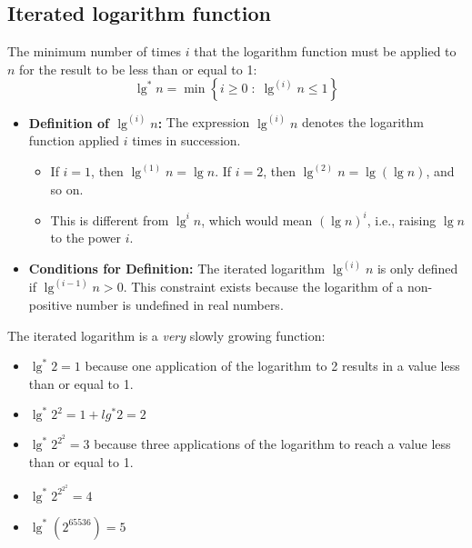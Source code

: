     \subsection{Iterated logarithm function}
        \begin{definition}
            The minimum number of times \( i \) that the logarithm function must be applied to \( n \) for the result to be less than or equal to 1:
            \begin{equation}
                \lg^{*} n = \min \left\{ i \geq 0 \; : \; \lg^{(i)} n \leq 1 \right\}
            \end{equation}
        \end{definition}
        \begin{intuition}
            \begin{itemize}
                \item \textbf{Definition of \( \lg^{(i)} n \):} The expression \( \lg^{(i)} n \) denotes the logarithm function applied \( i \) times in succession. 
                \begin{itemize}
                    \item If \( i = 1 \), then \( \lg^{(1)} n = \lg n \). If \( i = 2 \), then \( \lg^{(2)} n = \lg(\lg n) \), and so on. 
                    \item This is different from \( \lg^i n \), which would mean \( (\lg n)^i \), i.e., raising \( \lg n \) to the power \( i \). 
                \end{itemize}

                \item \textbf{Conditions for Definition:} The iterated logarithm \( \lg^{(i)} n \) is only defined if \( \lg^{(i-1)} n > 0 \). This constraint exists because the logarithm of a non-positive number is undefined in real numbers. 
             \end{itemize}
        \end{intuition}
        \begin{example}
            The iterated logarithm is a \emph{very} slowly growing function:

            \begin{itemize}
                \item \(\lg^{*} 2 = 1\) because one application of the logarithm to 2 results in a value less than or equal to 1.
                \item \(\lg^{*} 2^2 = 1 + lg^{*} 2 = 2\)
                \item \(\lg^{*} 2^{2^2} = 3\) because three applications of the logarithm to reach a value less than or equal to 1.
                \item \(\lg^{*} 2^{2^{2^2}} = 4\)
                \item \(\lg^{*} (2^{65536}) = 5\)
            \end{itemize}
        \end{example}

